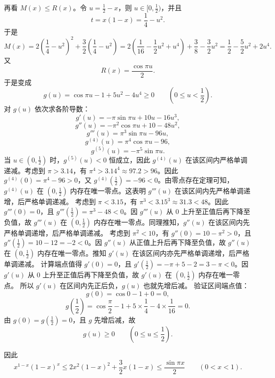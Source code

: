 \begin{solution}
再看 $M(x)\le R(x)$。令 $u=\frac12-x$，则 $u\in[0,\frac12)$，并且
\[
t=x(1-x)=\frac14-u^2.
\]
于是
$$ M(x) = 2\left(\frac{1}{4} - u^2\right)^2 + \frac{3}{2}\left(\frac{1}{4} - u^2\right) = 2\left(\frac{1}{16} - \frac{1}{2}u^2 + u^4\right) + \frac{3}{8} - \frac{3}{2}u^2 = \frac{1}{2} - \frac{5}{2}u^2 + 2u^4. $$
又
\[
R(x)=\frac{\cos \pi u}{2}.
\]
于是变成
\[
g(u)=\cos \pi u - 1 + 5u^2 - 4u^4\ge0\qquad \left(0\le u<\frac12\right).
\]
对 $g(u)$ 依次求各阶导数：
$$ g'(u) = -\pi\sin \pi u + 10u - 16u^3, $$
$$ g''(u) = -\pi^2\cos \pi u + 10 - 48u^2, $$
$$ g'''(u) = \pi^3\sin \pi u - 96u, $$
$$ g^{(4)}(u) = \pi^4\cos \pi u - 96, $$
$$ g^{(5)}(u) = -\pi^5\sin \pi u. $$
当 $u \in (0, \frac{1}{2})$ 时，$g^{(5)}(u) < 0$ 恒成立，因此 $g^{(4)}(u)$ 在该区间内严格单调递减。考虑到 $\pi > 3.14$，有 $\pi^4 > 3.14^4 \approx 97.2 > 96$。因此 $g^{(4)}(0) = \pi^4 - 96 > 0$，又 $g^{(4)}\left(\frac{1}{2}\right) = -96 < 0$。由零点存在定理可知，$g^{(4)}(u)$ 在 $\left(0, \frac{1}{2}\right)$ 内存在唯一零点。这表明 $g'''(u)$ 在该区间内先严格单调递增，后严格单调递减。
考虑到 $\pi < 3.15$，有 $\pi^3 < 3.15^3 \approx 31.3 < 48$。因此 $g'''(0) = 0$，且 $g'''\left(\frac{1}{2}\right) = \pi^3 - 48 < 0$。因 $g'''(u)$ 从 $0$ 上升至正值后再下降至负值，故 $g'''(u)$ 在 $\left(0, \frac{1}{2}\right)$ 内存在唯一零点。同理推知，$g''(u)$ 在该区间内先严格单调递增，后严格单调递减。
考虑到 $\pi^2 < 10$，有 $g''(0) = 10 - \pi^2 > 0$，且 $g''\left(\frac{1}{2}\right) = 10 - 12 = -2 < 0$。因 $g''(u)$ 从正值上升后再下降至负值，故 $g''(u)$ 在 $\left(0, \frac{1}{2}\right)$ 内存在唯一零点。推知 $g'(u)$ 在该区间内亦先严格单调递增，后严格单调递减。
计算端点值得 $g'(0) = 0$，且 $g'\left(\frac{1}{2}\right) = -\pi + 5 - 2 = 3 - \pi < 0$。因 $g'(u)$ 从 $0$ 上升至正值后再下降至负值，故 $g'(u)$ 在 $\left(0, \frac{1}{2}\right)$ 内存在唯一零点。
所以 $g'(u)$ 在区间内先正后负，$g(u)$ 也就先增后减。
验证区间端点值：
$$ g(0) = \cos 0 - 1 + 0 = 0, $$
$$ g\left(\frac{1}{2}\right) = \cos\frac{\pi}{2} - 1 + 5 \times \frac{1}{4} - 4 \times \frac{1}{16} = 0. $$
由 $g(0)=g\left(\frac12\right)=0$，且 $g$ 先增后减，故
\[
g(u)\ge0\qquad \left(0\le u\le\frac12\right).
\]

因此
\[
x^{1-x}(1-x)^x \le 2x^2(1-x)^2 + \frac{3}{2}x(1-x) \le \frac{\sin\pi x}{2}\qquad (0<x<1).
\]
\end{solution}


